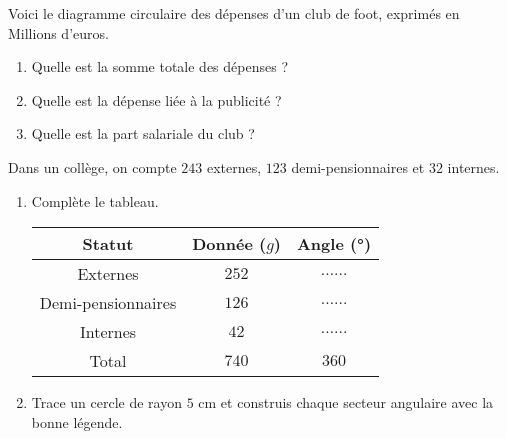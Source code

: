 \begin{pageAD} 



Voici le diagramme circulaire des dépenses d'un club de foot, exprimés en Millions d'euros.

\begin{minipage}{0.58\linewidth}


\end{minipage} 
\begin{minipage}{0.38\linewidth}
\begin{enumerate}[leftmargin=*]
\item Quelle est la somme totale des dépenses ? 
\item Quelle est la dépense liée à la publicité ? 
\item Quelle est la part salariale du club ? 
\end{enumerate}
\end{minipage}



Dans un collège, on compte $243$ externes,  $123$ demi-pensionnaires et $32$ internes.

\begin{enumerate}
\item Complète le tableau.

\begin{tabular}{|c|c|c|}\hline
Statut & Donnée ($g$) & Angle (°) \\\hline
Externes &  \textcolor{sacado_violet}{$252$} & $\ldots\ldots$ \\\hline
Demi-pensionnaires & \textcolor{bleu2}{$126$} & $\ldots\ldots$  \\\hline
Internes &  \textcolor{sacado_yellow}{$42$} & $\ldots\ldots$  \\\hline
Total & $740$ &  $360$ \\\hline
\end{tabular}

\item Trace un cercle de rayon $5$ cm et construis chaque secteur angulaire avec  la bonne légende.
\end{enumerate}


\end{pageAD}



